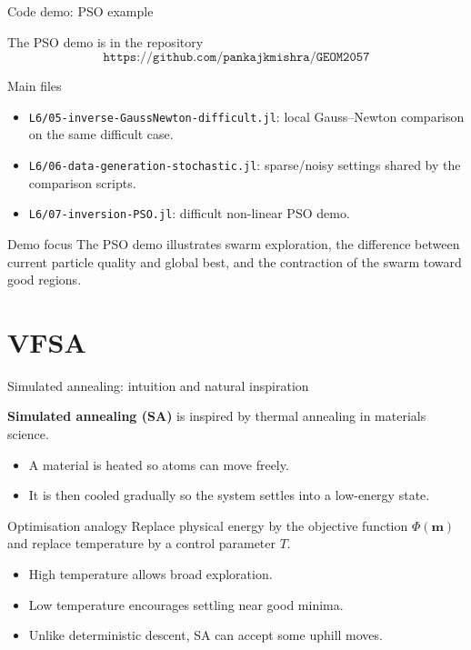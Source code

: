 \documentclass[aspectratio=169]{beamer}
\renewcommand{\vec}[1]{\mathbf{#1}}
\newcommand{\mm}{ {\vec{m}} }
\newcommand{\courserepo}{\texttt{https://github.com/pankajkmishra/GEOM2057}}
\begin{document}
\begin{frame}{Code demo: PSO example}
\small

The PSO demo is in the repository
\[
\courserepo
\]

\begin{block}{Main files}
\begin{itemize}
    \item[--] \texttt{L6/05-inverse-GaussNewton-difficult.jl}: local Gauss--Newton comparison on the same difficult case.
    \item[--] \texttt{L6/06-data-generation-stochastic.jl}: sparse/noisy settings shared by the comparison scripts.
    \item[--] \texttt{L6/07-inversion-PSO.jl}: difficult non-linear PSO demo.
\end{itemize}
\end{block}

\begin{alertblock}{Demo focus}
The PSO demo illustrates swarm exploration, the difference between current particle quality and global best, and the contraction of the swarm toward good regions.
\end{alertblock}
\end{frame}

\section{VFSA}

\begin{frame}{Simulated annealing: intuition and natural inspiration}
\small

\textbf{Simulated annealing (SA)} is inspired by thermal annealing in materials science.

\begin{itemize}
    \item[--] A material is heated so atoms can move freely.
    \item[--] It is then cooled gradually so the system settles into a low-energy state.
\end{itemize}

\begin{alertblock}{Optimisation analogy}
Replace physical \alert{energy} by the objective function $\Phi(\mm)$ and replace temperature by a control parameter $T$.
\end{alertblock}

\begin{itemize}
    \item[--] High temperature allows broad exploration.
    \item[--] Low temperature encourages settling near good minima.
    \item[--] Unlike deterministic descent, SA can accept some uphill moves.
\end{itemize}
\end{frame}
\end{document}
